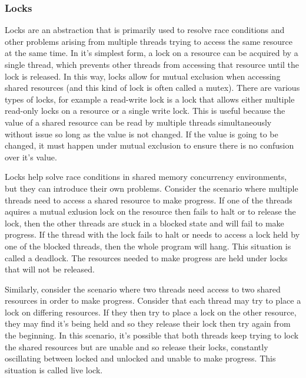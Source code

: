 \documentclass{article}
\begin{document}
\subsubsection{Locks}
Locks are an abstraction that is primarily used to resolve race conditions and
other problems arising from multiple threads trying to access the same resource
at the same time. In it's simplest form, a lock on a resource can be acquired by
a single thread, which prevents other threads from accessing that resource until
the lock is released. In this way, locks allow for mutual exclusion when accessing
shared resources (and this kind of lock is often called a mutex). There are various
types of locks, for example a read-write lock is a lock that allows either multiple
read-only locks on a resource or a single write lock. This is useful because the
value of a shared resource can be read by multiple threads simultaneously without
issue so long as the value is not changed. If the value is going to be changed, it
must happen under mutual exclusion to ensure there is no confusion over it's value.
\cite{Coursera}

Locks help solve race conditions in shared memory concurrency environments, but
they can introduce their own problems. Consider the scenario where multiple
threads need to access a shared resource to make progress. If one of the threads
aquires a mutual exlusion lock on the resource then fails to halt or to release
the lock, then the other threads are stuck in a blocked state and will fail to
make progress. If the thread with the lock fails to halt or needs to access a
lock held by one of the blocked threads, then the whole program will hang. This
situation is called a deadlock. The resources needed to make progress are held
under locks that will not be released.
\cite{Coursera}

Similarly, consider the scenario where two threads need access to two shared
resources in order to make progress. Consider that each thread may try to place
a lock on differing resources. If they then try to place a lock on the other
resource, they may find it's being held and so they release their lock then
try again from the beginning. In this scenario, it's possible that both threads
keep trying to lock the shared resources but are unable and so release their locks,
constantly oscillating between locked and unlocked and unable to make progress.
This situation is called live lock.
\cite{Coursera}
\end{document}
